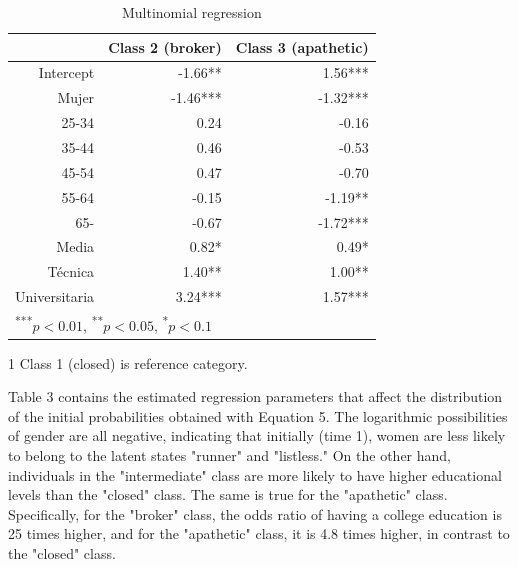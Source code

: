 \begin{table}[H]
\centering
\begin{threeparttable}
\caption{\label{demo-table} Multinomial regression}
\begin{tabular}{rrr}
  \hline
 & Class 2 (broker) & Class 3 (apathetic)\\ 
  \hline
Intercept & -1.66** & 1.56*** \\ 
  Mujer & -1.46*** & -1.32*** \\ 
  25-34 & 0.24 & -0.16 \\ 
  35-44 & 0.46 & -0.53 \\ 
  45-54 & 0.47 & -0.70 \\ 
  55-64 & -0.15 & -1.19** \\ 
  65- & -0.67 & -1.72*** \\ 
  Media & 0.82* & 0.49* \\ 
  Técnica & 1.40** & 1.00** \\ 
  Universitaria & 3.24*** & 1.57*** \\ 
   \hline
\multicolumn{3}{l}{\textsuperscript{***}$p<0.01$, 
  \textsuperscript{**}$p<0.05$, 
  \textsuperscript{*}$p<0.1$}
\end{tabular}
\begin{tablenotes}
    \item[1] Class 1 (closed) is reference category.
  \end{tablenotes}
\end{threeparttable}
\end{table}

Table 3 contains the estimated regression parameters that affect the distribution of the initial probabilities obtained with Equation 5. The logarithmic possibilities of gender are all negative, indicating that initially (time 1), women are less likely to belong to the latent states "runner" and "listless." On the other hand, individuals in the "intermediate" class are more likely to have higher educational levels than the "closed" class. The same is true for the "apathetic" class. Specifically, for the "broker" class, the odds ratio of having a college education is 25 times higher, and for the "apathetic" class, it is 4.8 times higher, in contrast to the "closed" class.


